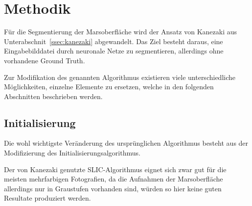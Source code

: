 \chapter{Methodik}
\label{chap:methodik}

Für die Segmentierung der Marsoberfläche wird der Ansatz von Kanezaki \etal \cite{kanezaki_18} aus Unterabschnit~\ref{ssec:kanezaki} abgewandelt. Das Ziel besteht daraus, eine Eingabebilddatei durch neuronale Netze zu segmentieren, allerdings ohne vorhandene Ground Truth.

Zur Modifikation des genannten Algorithmus existieren viele unterschiedliche Möglichkeiten, einzelne Elemente zu ersetzen, welche in den folgenden Abschnitten beschrieben werden.

\section{Initialisierung}
\label{sec:initialization}

Die wohl wichtigste Veränderung des ursprünglichen Algorithmus besteht aus der Modifizierung des Initialisierungsalgorithmus.

Der von Kanezaki \etal genutzte SLIC-Algorithmus eignet sich zwar gut für die meisten mehrfarbigen Fotografien, da die Aufnahmen der Marsoberfläche allerdings nur in Graustufen vorhanden sind, würden so hier keine guten Resultate produziert werden.

